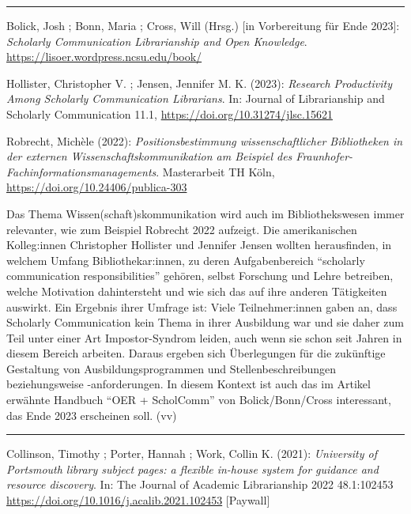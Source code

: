 \documentclass[a4paper,
fontsize=11pt,
oneside,
numbers=noperiodatend,
parskip=half-,
bibliography=totoc,
final
]{scrartcl}
\begin{document}
\begin{center}\rule{0.5\linewidth}{0.5pt}\end{center}

Bolick, Josh ; Bonn, Maria ; Cross, Will (Hrsg.) {[}in Vorbereitung für
Ende 2023{]}: \emph{Scholarly Communication Librarianship and Open
Knowledge}. \url{https://lisoer.wordpress.ncsu.edu/book/}

Hollister, Christopher V. ; Jensen, Jennifer M. K. (2023):
\emph{Research Productivity Among Scholarly Communication Librarians}.
In: Journal of Librarianship and Scholarly Communication 11.1,
\url{https://doi.org/10.31274/jlsc.15621}

Robrecht, Michèle (2022): \emph{Positionsbestimmung wissenschaftlicher
Bibliotheken in der externen Wissenschaftskommunikation am Beispiel des
Fraunhofer-Fachinformationsmanagements}. Masterarbeit TH Köln,
\url{https://doi.org/10.24406/publica-303}

Das Thema Wissen(schaft)skommunikation wird auch im Bibliothekswesen
immer relevanter, wie zum Beispiel Robrecht 2022 aufzeigt. Die
amerikanischen Kolleg:innen Christopher Hollister und Jennifer Jensen
wollten herausfinden, in welchem Umfang Bibliothekar:innen, zu deren
Aufgabenbereich \enquote{scholarly communication responsibilities}
gehören, selbst Forschung und Lehre betreiben, welche Motivation
dahintersteht und wie sich das auf ihre anderen Tätigkeiten auswirkt.
Ein Ergebnis ihrer Umfrage ist: Viele Teilnehmer:innen gaben an, dass
Scholarly Communication kein Thema in ihrer Ausbildung war und sie daher
zum Teil unter einer Art Impostor-Syndrom leiden, auch wenn sie schon
seit Jahren in diesem Bereich arbeiten. Daraus ergeben sich Überlegungen
für die zukünftige Gestaltung von Ausbildungsprogrammen und
Stellenbeschreibungen beziehungsweise -anforderungen. In diesem Kontext
ist auch das im Artikel erwähnte Handbuch \enquote{OER + ScholComm} von
Bolick/Bonn/Cross interessant, das Ende 2023 erscheinen soll. (vv)

\begin{center}\rule{0.5\linewidth}{0.5pt}\end{center}

Collinson, Timothy ; Porter, Hannah ; Work, Collin K. (2021):
\emph{University of Portsmouth library subject pages: a flexible
in-house system for guidance and resource discovery}. In: The Journal of
Academic Librarianship 2022 48.1:102453
\url{https://doi.org/10.1016/j.acalib.2021.102453} {[}Paywall{]}
\end{document}
